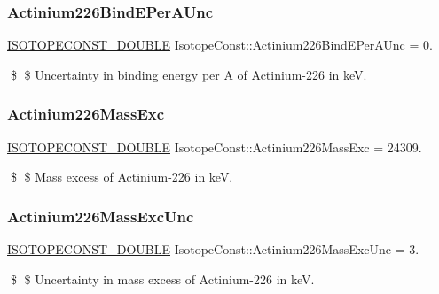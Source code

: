 \subsubsection{\texorpdfstring{Actinium226\+Bind\+E\+Per\+A\+Unc}{Actinium226BindEPerAUnc}}
{\footnotesize\ttfamily \mbox{\hyperlink{group___isotope_const-_macros_ga8f45a7272ce02c0b4c65c44636ed719a}{I\+S\+O\+T\+O\+P\+E\+C\+O\+N\+S\+T\+\_\+\+D\+O\+U\+B\+LE}} Isotope\+Const\+::\+Actinium226\+Bind\+E\+Per\+A\+Unc = 0.}

\$ \$ Uncertainty in binding energy per A of Actinium-\/226 in keV. \mbox{\label{group___isotope_const-_actinium-_ac226_gaa9db54fc7f21186e4edc0979a7463440}} 
\subsubsection{\texorpdfstring{Actinium226\+Mass\+Exc}{Actinium226MassExc}}
{\footnotesize\ttfamily \mbox{\hyperlink{group___isotope_const-_macros_ga8f45a7272ce02c0b4c65c44636ed719a}{I\+S\+O\+T\+O\+P\+E\+C\+O\+N\+S\+T\+\_\+\+D\+O\+U\+B\+LE}} Isotope\+Const\+::\+Actinium226\+Mass\+Exc = 24309.}

\$ \$ Mass excess of Actinium-\/226 in keV. \mbox{\label{group___isotope_const-_actinium-_ac226_ga8fc5603156e7908ed36c22b700a5db1e}} 
\subsubsection{\texorpdfstring{Actinium226\+Mass\+Exc\+Unc}{Actinium226MassExcUnc}}
{\footnotesize\ttfamily \mbox{\hyperlink{group___isotope_const-_macros_ga8f45a7272ce02c0b4c65c44636ed719a}{I\+S\+O\+T\+O\+P\+E\+C\+O\+N\+S\+T\+\_\+\+D\+O\+U\+B\+LE}} Isotope\+Const\+::\+Actinium226\+Mass\+Exc\+Unc = 3.}

\$ \$ Uncertainty in mass excess of Actinium-\/226 in keV. \mbox{\label{group___isotope_const-_actinium-_ac226_ga1c411deb4e5718be57e8519fd6ee370e}} 
